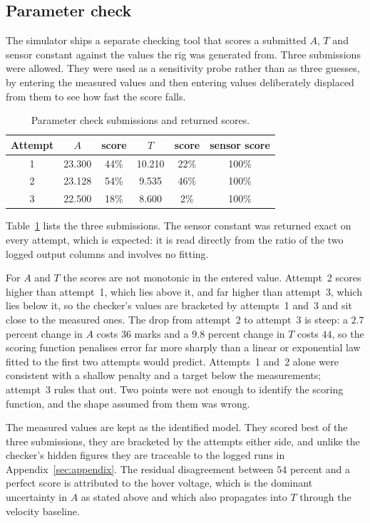 \subsection{Parameter check}
The simulator ships a separate checking tool that scores a submitted $A$, $T$ and sensor constant
against the values the rig was generated from. Three submissions were allowed. They were used as a
sensitivity probe rather than as three guesses, by entering the measured values and then entering
values deliberately displaced from them to see how fast the score falls.

\begin{table}[htbp]
\centering
\caption{Parameter check submissions and returned scores.}
\label{tab:paramcheck}
\begin{tabular}{cccccc}
\hline
Attempt & $A$ & score & $T$ & score & sensor score \\
\hline
1 & 23.300 & 44\% & 10.210 & 22\% & 100\% \\
2 & 23.128 & 54\% & \phantom{0}9.535 & 46\% & 100\% \\
3 & 22.500 & 18\% & \phantom{0}8.600 & \phantom{0}2\% & 100\% \\
\hline
\end{tabular}
\end{table}

Table~\ref{tab:paramcheck} lists the three submissions. The sensor constant was returned exact on every attempt, which is expected: it is read directly
from the ratio of the two logged output columns and involves no fitting.

For $A$ and $T$ the scores are not monotonic in the entered value. Attempt~2 scores higher than
attempt~1, which lies above it, and far higher than attempt~3, which lies below it, so the
checker's values are bracketed by attempts~1 and~3 and sit close to the measured ones. The drop
from attempt~2 to attempt~3 is steep: a $2.7$ percent change in $A$ costs $36$ marks and a $9.8$
percent change in $T$ costs $44$, so the scoring function penalises error far more sharply than a
linear or exponential law fitted to the first two attempts would predict. Attempts~1 and~2 alone
were consistent with a shallow penalty and a target below the measurements; attempt~3 rules that
out. Two points were not enough to identify the scoring function, and the shape assumed from them
was wrong.

The measured values are kept as the identified model. They scored best of the three submissions,
they are bracketed by the attempts either side, and unlike the checker's hidden figures they are
traceable to the logged runs in Appendix~\ref{sec:appendix}. The residual disagreement between
$54$ percent and a perfect score is attributed to the hover voltage, which is the dominant
uncertainty in $A$ as stated above and which also propagates into $T$ through the velocity
baseline.
